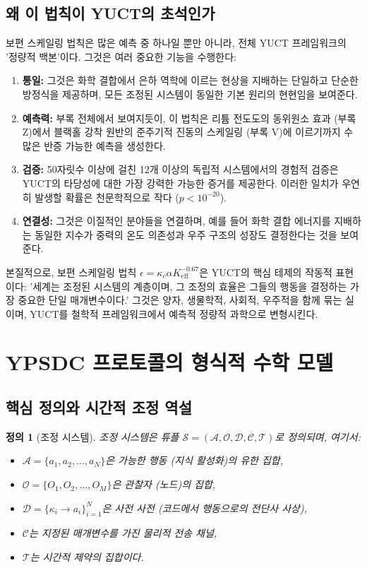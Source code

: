 \documentclass[11pt,a4paper]{article}
\newtheorem{definition}{정의}
\begin{document}
\subsection{왜 이 법칙이 YUCT의 초석인가}

보편 스케일링 법칙은 많은 예측 중 하나일 뿐만 아니라, 전체 YUCT 프레임워크의 '정량적 백본'이다. 그것은 여러 중요한 기능을 수행한다:
\begin{enumerate}
	\item \textbf{통일:} 그것은 화학 결합에서 은하 역학에 이르는 현상을 지배하는 단일하고 단순한 방정식을 제공하며, 모든 조정된 시스템이 동일한 기본 원리의 현현임을 보여준다.
	\item \textbf{예측력:} 부록 전체에서 보여지듯이, 이 법칙은 리튬 전도도의 동위원소 효과 (부록 Z)에서 블랙홀 강착 원반의 준주기적 진동의 스케일링 (부록 V)에 이르기까지 수많은 반증 가능한 예측을 생성한다.
	\item \textbf{검증:} 50자릿수 이상에 걸친 12개 이상의 독립적 시스템에서의 경험적 검증은 YUCT의 타당성에 대한 가장 강력한 가능한 증거를 제공한다. 이러한 일치가 우연히 발생할 확률은 천문학적으로 작다 ($p < 10^{-20}$).
	\item \textbf{연결성:} 그것은 이질적인 분야들을 연결하며, 예를 들어 화학 결합 에너지를 지배하는 동일한 지수가 중력의 온도 의존성과 우주 구조의 성장도 결정한다는 것을 보여준다.
\end{enumerate}

본질적으로, 보편 스케일링 법칙 $\epsilon = \kappa_c \alpha K_{\mathrm{eff}}^{-0.67}$은 YUCT의 핵심 테제의 작동적 표현이다: '세계는 조정된 시스템의 계층이며, 그 조정의 효율은 그들의 행동을 결정하는 가장 중요한 단일 매개변수이다.' 그것은 양자, 생물학적, 사회적, 우주적을 함께 묶는 실이며, YUCT를 철학적 프레임워크에서 예측적 정량적 과학으로 변형시킨다.

\section{YPSDC 프로토콜의 형식적 수학 모델}
\label{sec:formal-model}

\subsection{핵심 정의와 시간적 조정 역설}

\begin{definition}[조정 시스템]
	조정 시스템은 튜플 $\mathcal{S} = (\mathcal{A}, \mathcal{O}, \mathcal{D}, \mathcal{C}, \mathcal{T})$로 정의되며, 여기서:
	\begin{itemize}
		\item $\mathcal{A} = \{a_1, a_2, \dots, a_N\}$은 가능한 행동 (지식 활성화)의 유한 집합,
		\item $\mathcal{O} = \{O_1, O_2, \dots, O_M\}$은 관찰자 (노드)의 집합,
		\item $\mathcal{D} = \{\kappa_i \to a_i\}_{i=1}^N$은 사전 사전 (코드에서 행동으로의 전단사 사상),
		\item $\mathcal{C}$는 지정된 매개변수를 가진 물리적 전송 채널,
		\item $\mathcal{T}$는 시간적 제약의 집합이다.
	\end{itemize}
\end{definition}
\end{document}
